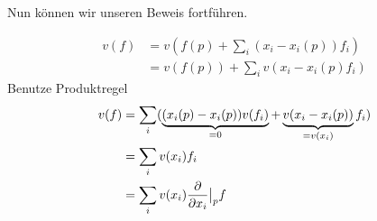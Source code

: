 Nun können wir unseren Beweis fortführen.

\begin{bew} \leavevmode
\begin{align}
v(f) &= v(f(p) + \sum_i (x_i - x_i(p)) f_i) \\
&= v(f(p)) + \sum_i v(x_i - x_i (p) f_i)
\end{align}
Benutze Produktregel
\begin{align}
v(f) &= \sum_i (\underbrace{(x_i (p) - x_i (p)) v(f_i)}_{=0} + \underbrace{v(x_i - x_i (p))}_{=v(x_i)} f_i) \\
&= \sum_i v(x_i) f_i \\
&= \sum_i v(x_i) \pdv{x_i} \big\vert_p f 
\end{align}
\end{bew}

